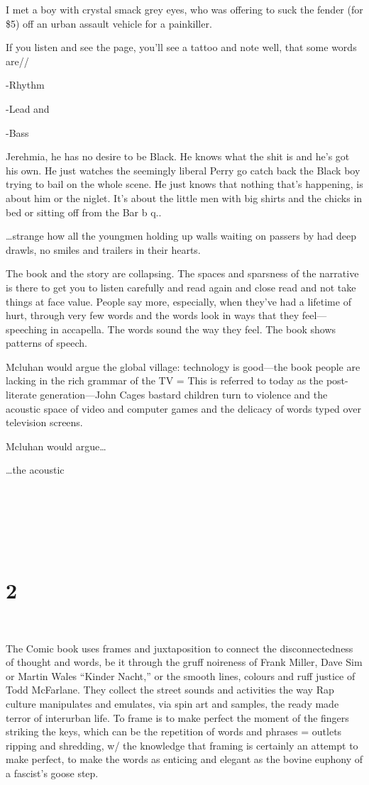 \documentclass[
]{memoir}
\begin{document}
I met a boy with crystal smack grey eyes, who was offering to suck the
fender (for \$5) off an urban assault vehicle for a painkiller.

If you listen and see the page, you'll see a tattoo and note well, that
some words are//

-Rhythm

-Lead and

-Bass

Jerehmia, he has no desire to be Black. He knows what the shit is and
he's got his own. He just watches the seemingly liberal Perry go catch
back the Black boy trying to bail on the whole scene. He just knows that
nothing that's happening, is about him or the niglet. It's about the
little men with big shirts and the chicks in bed or sitting off from the
Bar b q..

\ldots{}strange how all the youngmen holding up walls waiting on passers
by had deep drawls, no smiles and trailers in their hearts.

The book and the story are collapsing. The spaces and sparsness of the
narrative is there to get you to listen carefully and read again and
close read and not take things at face value. People say more,
especially, when they've had a lifetime of hurt, through very few words
and the words look in ways that they feel---speeching in accapella. The
words sound the way they feel. The book shows patterns of speech.

Mcluhan would argue the global village: technology is good---the book
people are lacking in the rich grammar of the TV = This is referred to
today as the post-literate generation---John Cages bastard children turn
to violence and the acoustic space of video and computer games and the
delicacy of words typed over television screens.

Mcluhan would argue\ldots{}

\ldots{}the acoustic

~

~

~

\hypertarget{section-1}{%
\section*{2}\label{section-1}}

~

The Comic book uses frames and juxtaposition to connect the
disconnectedness of thought and words, be it through the gruff noireness
of Frank Miller, Dave Sim or Martin Wales ``Kinder Nacht,'' or the
smooth lines, colours and ruff justice of Todd McFarlane. They collect
the street sounds and activities the way Rap culture manipulates and
emulates, via spin art and samples, the ready made terror of interurban
life. To frame is to make perfect the moment of the fingers striking the
keys, which can be the repetition of words and phrases = outlets ripping
and shredding, w/ the knowledge that framing is certainly an attempt to
make perfect, to make the words as enticing and elegant as the bovine
euphony of a fascist's goose step.
\end{document}

